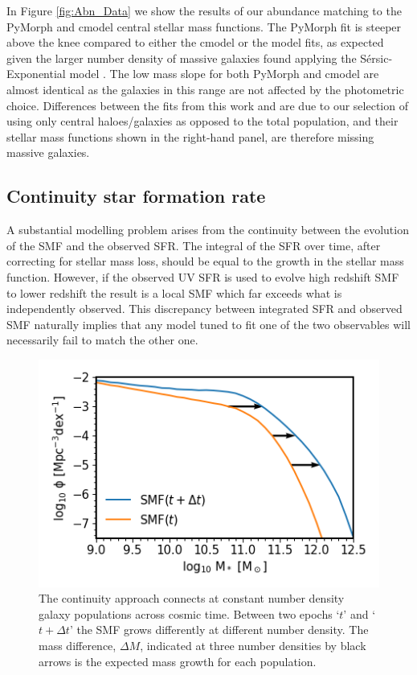 In Figure \ref{fig:Abn_Data} we show the results of our abundance matching to the PyMorph and cmodel central stellar mass functions. The PyMorph fit is steeper above the knee compared to either the cmodel or the \citet{Moster2013} model fits, as expected given the larger number density of massive galaxies found applying the S\'ersic-Exponential model \citep[eg.,][]{Shankar2014, Kravtsov2018StellarHalos}. The low mass slope for both PyMorph and cmodel are almost identical as the galaxies in this range are not affected by the photometric choice. Differences between the fits from this work and \citet{Moster2013} are due to our selection of using only central haloes/galaxies as opposed to the total population, and their stellar mass functions shown in the right-hand panel, are therefore missing massive galaxies.


\subsection{Continuity star formation rate}

A substantial modelling problem arises from the continuity between the evolution of the SMF and the observed SFR. The integral of the SFR over time, after correcting for stellar mass loss, should be equal to the growth in the stellar mass function. However, if the observed UV SFR is used to evolve high redshift SMF to lower redshift the result is a local SMF which far exceeds what is independently observed. This discrepancy between integrated SFR and observed SMF naturally implies that any model tuned to fit one of the two observables will necessarily fail to match the other one.

\begin{figure}[h]
    \centering
    \includegraphics[width = \linewidth]{Figures/Chapter2/ContinuityEqn.png}
    \caption{The continuity approach connects at constant number density galaxy populations across cosmic time. Between two epochs `$t$' and `$t + \Delta t$' the SMF grows differently at different number density. The mass difference, $\Delta M$, indicated at three number densities by black arrows is the expected mass growth for each population.}
    \label{fig:Cont_Eqn}
\end{figure}

